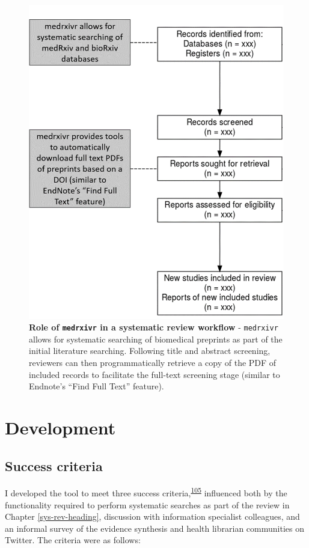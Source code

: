 \documentclass[a4paper, twoside]{templates/ociamthesis}
\begin{document}
\begin{figure}

{\centering \includegraphics[width=0.65\linewidth]{figures/sys-rev-tools/medrxiv-role} 

}

\caption[Role of \texttt{medrxivr} in a systematic review workflow]{\textbf{Role of \texttt{medrxivr} in a systematic review workflow} - \texttt{medrxivr} allows for systematic searching of biomedical preprints as part of the initial literature searching. Following title and abstract screening, reviewers can then programmatically retrieve a copy of the PDF of included records to facilitate the full-text screening stage (similar to Endnote's ``Find Full Text'' feature).}\label{fig:medrxivr-sr}
\end{figure}

\hypertarget{development}{%
\section{Development}\label{development}}

\hypertarget{success-criteria}{%
\subsection{Success criteria}\label{success-criteria}}

I developed the tool to meet three success criteria,\textsuperscript{\protect\hyperlink{ref-wateridge1995}{105}} influenced both by the functionality required to perform systematic searches as part of the review in Chapter \ref{sys-rev-heading}, discussion with information specialist colleagues, and an informal survey of the evidence synthesis and health librarian communities on Twitter. The criteria were as follows:
\end{document}
